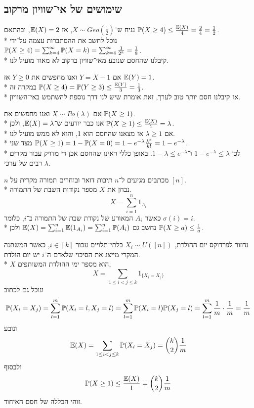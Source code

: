 \subsection{שימושים של אי־שוויון מרקוב}
\begin{example}
	נניח ש־$X \sim Geo(\frac{1}{2})$, אז $\mathbb{E}(X) = 2$, ובהתאם $\mathbb{P}(X \ge 4) \le \frac{\mathbb{E}(X)}{4} = \frac{2}{4} = \frac{1}{2}$. \\*
	נוכל לחשב את ההסתברות עצמה על־ידי $\mathbb{P}(X \ge 4) = \sum_{k = 4}^{\infty} \mathbb{P}(X = k) = \sum_{k = 4}^{\infty} \frac{1}{2^k} = \frac{1}{8}$. \\*
	קיבלנו שהחסם שנובע מאי־שוויון ברקוב לא מאוד מועיל לנו.

	אם $Y = X - 1$ ואנו מחפשים את $Y \ge 0$ אז $\mathbb{E}(Y) = 1$. \\*
	במקרה זה $\mathbb{P}(X \ge 4) = \mathbb{P}(Y \ge 3) \le \frac{\mathbb{E}(Y)}{3} = \frac{1}{3}$. \\*
	אז קיבלנו חסם יותר טוב לערך, זאת אומרת שיש לנו דרך נוספת להשתמש באי־השוויון.
\end{example}
\begin{example}
	אם $X \sim Po(\lambda)$ ואנו מחפשים את $\mathbb{P}(X \ge 1)$. \\*
	אנו כבר יודעים ש־$\mathbb{E}(X) = \lambda$, ולכן $\mathbb{P}(X \ge 1) \le \frac{\mathbb{E}(X)}{1} = \lambda$. \\*
	אם $\lambda \ge 1$ אז מצאנו שהחסם הוא 1, והוא לא ממש מועיל לנו. \\*
	מצד שני $\mathbb{P}(X \ge 1) = 1 - \mathbb{P}(X = 0) = 1 - e^{-\lambda} \frac{\lambda^k}{k!} = 1 - e^{-\lambda}$. \\*
	לכן $1 - e^{-\lambda} \le \lambda$ ו־$1 - \lambda \le e^{-\lambda}$.
	באופן כללי ראינו שהחסם אכן די מדויק עבור מקרים רבים של ערכי $\lambda$.
\end{example}
\begin{example}
	$n$ מכתבים מגיעים ל־$n$ תיבות דואר ובוחרים תמורה מקרית על $[n]$. \\*
	נבחן את $X$ מספר נקודות השבת של התמורה.
	\[
		X = \sum_{i = 1}^{n} 1_{A_i}
	\]
	כאשר $A_i$ המאורע של נקודת שבת של התמורה ב־$i$, כלומר $\sigma(i) = i$. \\*
	נחשב גם $\mathbb{E}(X) = \sum_{i = 1}^{n} \mathbb{E}(1_{A_i}) = \sum_{i = 1}^{n} \mathbb{P}(A_i)$ ולכן $\mathbb{P}(X \ge a) \le \frac{1}{a}$.
\end{example}
\begin{example}
	נחזור לפרדוקס יום ההולדת, $X_i \sim U([n])$ בלתי־תלויים עבור $i \in [k]$, כאשר המשתנה המקרי מייצג את הסיכוי שלאדם ה־$i$ יש יום הולדת. \\*
	$X$ הוא מספר ימי ההולדת המשותפים,
	\[
		X = \sum_{1 \le i < j \le k} 1_{\{X_i = X_j\}}
	\]
	ונוכל גם לכתוב
	\[
		\mathbb{P}(X_i = X_j)
		= \sum_{l = 1}^m \mathbb{P}(X_i = l, X_j = l)
		= \sum_{l = 1}^m \mathbb{P}(X_i = l) \mathbb{P}(X_j = l)
		= \sum_{l = 1}^m \frac{1}{m} \cdot \frac{1}{m}
		= \frac{1}{m}
	\]
	ונובע
	\[
		\mathbb{E}(X)
		= \sum_{1 \le i < j \le k} \mathbb{P}(X_i = X_j)
		= \binom{k}{2} \frac{1}{m}
	\]
	ולבסוף
	\[
		\mathbb{P}(X \ge 1) \le \frac{\mathbb{E}(X)}{1} = \binom{k}{2} \frac{1}{m}
	\]
	זוהי הכללה של חסם האיחוד.
\end{example}
